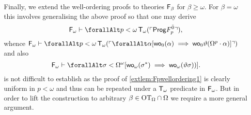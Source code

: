 \documentclass[UKenglish,cleveref,DIV=12]{scrartcl}
\let\forall\forallAlt
\theoremstyle{definition}
\theoremstyle{definition}
\begin{document}
Finally, we extend the well-ordering proofs to theories $\mathsf{F}_\beta$ for
$\beta\ge\omega$. For $\beta=\omega$ this involves generalising the above proof
so that one may derive
\begin{align}\label{exteqn:Fbetawellordering0.1}
  \F_\omega\proves\forall p<\omega\,\T_\omega(\gn{\Prog F_p^{\bar0}}),
\end{align}
whence $\F_\omega \proves\forall
p<\omega\,\T_\omega(\gn{\forall\alpha[\wo_{0}(\alpha)\implies\wo_{0}
\vartheta(\Omega^p\cdot\alpha)]})$ and also
\begin{align*}
  \F_\omega\proves \forall\sigma<\Omega^\omega[\wo_\omega(\sigma^*)\implies
  \wo_\omega(\vartheta\sigma))].
\end{align*}
 is not difficult to establish as the proof of
\cref{extlem:Fpwellordering1} is clearly uniform in $p<\omega$ and thus can be
repeated under a $\mathsf{T}_\omega$ predicate in $\mathsf{F}_\omega$. But in order to lift the
construction to arbitrary $\beta\in\mathrm{OT}_\Omega\cap\Omega$ we require a more
general argument.
\end{document}
